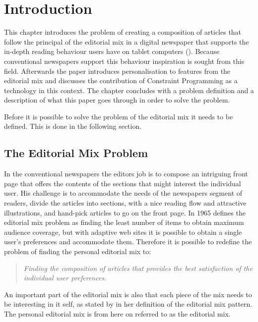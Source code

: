 \chapter{Introduction} %
\label{ch:introduction}
This chapter introduces the problem of creating a composition of articles that follow the principal of the editorial mix in a digital newspaper that supports the in-depth reading behaviour users have on tablet computers (\cite{TabletRead}). Because conventional newspapers support this behaviour inspiration is sought from this field. Afterwards the paper introduces personalisation to features from the editorial mix and discusses the contribution of Constraint Programming as a technology in this context. The chapter concludes with a problem definition and a description of what this paper goes through in order to solve the problem.

Before it is possible to solve the problem of the editorial mix it needs to be defined. This is done in the following section.

\section{The Editorial Mix Problem}
In the conventional newspapers the editors job is to compose an intriguing front page that offers the contents of the sections that might interest the individual user. His challenge is to accommodate the needs of the newspapers segment of readers, divide the articles into sections, with a nice reading flow and attractive illustrations, and hand-pick articles to go on the front page. In 1965 \cite{EditorsDilemma} defines the editorial mix problem as finding the least number of items to obtain maximum audience coverage, but with adaptive web sites it is possible to obtain a single user's preferences and accommodate them.
\clearpage
Therefore it is possible to redefine the problem of finding the personal editorial mix to:
\begin{quotation}
	\emph{Finding the composition of articles that provides the best satisfaction of the individual user preferences.}
\end{quotation}
%
An important part of the editorial mix is also that each piece of the mix needs to be interesting in it self, as stated by \cite{Tidwell} in her definition of the editorial mix pattern. The personal editorial mix is from here on referred to as the editorial mix.

